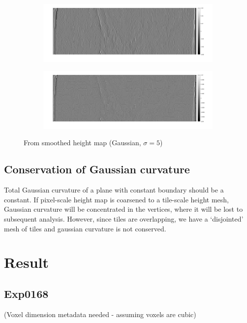 \documentclass[10pt,a4paper]{article}
\begin{document}
\begin{figure}
\begin{subfigure}{\textwidth}
\centering
\includegraphics[width=\textwidth]{435_smooth5_gC.png}
\end{subfigure}
\begin{subfigure}{\textwidth}
\includegraphics[width=\textwidth]{435_smooth5_mc.png}
\end{subfigure}
\caption{From smoothed height map (Gaussian, $\sigma=5$)}
\end{figure}

\subsection{Conservation of Gaussian curvature}
Total Gaussian curvature of a plane with constant boundary should be a constant.  If pixel-scale height map is coarsened to a tile-scale height mesh, Gaussian curvature will be concentrated in the vertices, where it will be lost to subsequent analysis.  However, since tiles are overlapping, we have a `disjointed' mesh of tiles and gaussian curvature is not conserved.
\section{Result}
\subsection{Exp0168}
(Voxel dimension metadata needed - assuming voxels are cubic)
\end{document}
